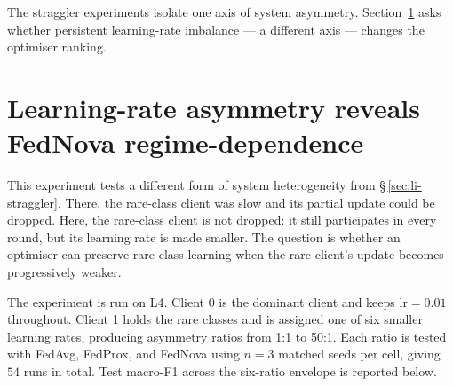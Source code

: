 \documentclass[11pt,a4paper]{report}
\begin{document}
The straggler experiments isolate one axis of system asymmetry.
Section~\ref{sec:lr-asymmetry} asks whether persistent learning-rate
imbalance --- a different axis --- changes the optimiser ranking.





\section{Learning-rate asymmetry reveals FedNova regime-dependence}
\label{sec:lr-asymmetry}

This experiment tests a different form of system heterogeneity from
\S\,\ref{sec:li-straggler}. There, the rare-class client was slow and its
partial update could be dropped. Here, the rare-class client is not dropped:
it still participates in every round, but its learning rate is made smaller.
The question is whether an optimiser can preserve rare-class learning when
the rare client's update becomes progressively weaker.

The experiment is run on L4. Client 0 is the dominant client and keeps
$\textrm{lr}=0.01$ throughout. Client 1 holds the rare classes and is assigned
one of six smaller learning rates, producing asymmetry ratios from 1:1 to
50:1. Each ratio is tested with FedAvg, FedProx, and FedNova using $n=3$
matched seeds per cell, giving $54$ runs in total. Test macro-F1 across the
six-ratio envelope is reported below.

\begin{center}
\end{center}
\end{document}
